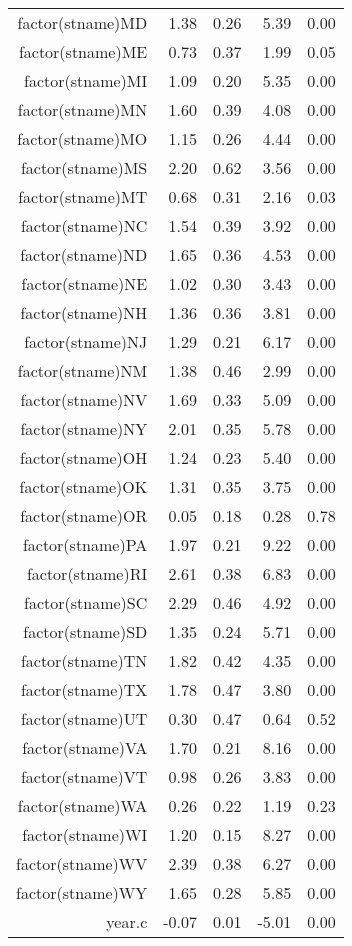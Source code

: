 \begin{table}[ht]
\begin{tabular}{rrrrr}
  factor(stname)MD & 1.38 & 0.26 & 5.39 & 0.00 \\ 
  factor(stname)ME & 0.73 & 0.37 & 1.99 & 0.05 \\ 
  factor(stname)MI & 1.09 & 0.20 & 5.35 & 0.00 \\ 
  factor(stname)MN & 1.60 & 0.39 & 4.08 & 0.00 \\ 
  factor(stname)MO & 1.15 & 0.26 & 4.44 & 0.00 \\ 
  factor(stname)MS & 2.20 & 0.62 & 3.56 & 0.00 \\ 
  factor(stname)MT & 0.68 & 0.31 & 2.16 & 0.03 \\ 
  factor(stname)NC & 1.54 & 0.39 & 3.92 & 0.00 \\ 
  factor(stname)ND & 1.65 & 0.36 & 4.53 & 0.00 \\ 
  factor(stname)NE & 1.02 & 0.30 & 3.43 & 0.00 \\ 
  factor(stname)NH & 1.36 & 0.36 & 3.81 & 0.00 \\ 
  factor(stname)NJ & 1.29 & 0.21 & 6.17 & 0.00 \\ 
  factor(stname)NM & 1.38 & 0.46 & 2.99 & 0.00 \\ 
  factor(stname)NV & 1.69 & 0.33 & 5.09 & 0.00 \\ 
  factor(stname)NY & 2.01 & 0.35 & 5.78 & 0.00 \\ 
  factor(stname)OH & 1.24 & 0.23 & 5.40 & 0.00 \\ 
  factor(stname)OK & 1.31 & 0.35 & 3.75 & 0.00 \\ 
  factor(stname)OR & 0.05 & 0.18 & 0.28 & 0.78 \\ 
  factor(stname)PA & 1.97 & 0.21 & 9.22 & 0.00 \\ 
  factor(stname)RI & 2.61 & 0.38 & 6.83 & 0.00 \\ 
  factor(stname)SC & 2.29 & 0.46 & 4.92 & 0.00 \\ 
  factor(stname)SD & 1.35 & 0.24 & 5.71 & 0.00 \\ 
  factor(stname)TN & 1.82 & 0.42 & 4.35 & 0.00 \\ 
  factor(stname)TX & 1.78 & 0.47 & 3.80 & 0.00 \\ 
  factor(stname)UT & 0.30 & 0.47 & 0.64 & 0.52 \\ 
  factor(stname)VA & 1.70 & 0.21 & 8.16 & 0.00 \\ 
  factor(stname)VT & 0.98 & 0.26 & 3.83 & 0.00 \\ 
  factor(stname)WA & 0.26 & 0.22 & 1.19 & 0.23 \\ 
  factor(stname)WI & 1.20 & 0.15 & 8.27 & 0.00 \\ 
  factor(stname)WV & 2.39 & 0.38 & 6.27 & 0.00 \\ 
  factor(stname)WY & 1.65 & 0.28 & 5.85 & 0.00 \\ 
  year.c & -0.07 & 0.01 & -5.01 & 0.00 \\ 
   \hline
\end{tabular}
\end{table}
